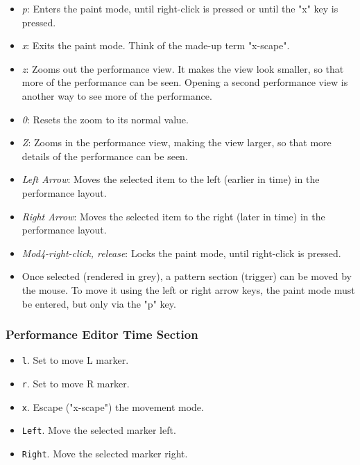    \begin{itemize}
      \item \textsl{p}:  Enters the paint mode, until right-click is pressed or
         until the "x" key is pressed.
      \item \textsl{x}:  Exits the paint mode.  Think of the made-up term
         "x-scape".
      \item \textsl{z}:  Zooms out the performance view.  It makes the view
         look smaller, so that more of the performance can be seen.
         Opening a second performance view is another way to see more
         of the performance.
      \item \textsl{0}:  Resets the zoom to its normal value.
      \item \textsl{Z}:  Zooms in the performance view, making the view
         larger, so that more details of the performance can be seen.
      \item \textsl{Left Arrow}:  Moves the selected item to the left (earlier
         in time) in the performance layout.
      \item \textsl{Right Arrow}:  Moves the selected item to the right (later
         in time) in the performance layout.
      \item \textsl{Mod4-right-click, release}:  Locks the paint mode,
         until right-click is pressed.
      \item Once selected (rendered in grey), a pattern section (trigger)
         can be moved by the mouse.
         To move it using the left or right
         arrow keys, the paint mode must be entered, but only via the "p"
         key.
   \end{itemize}

\subsubsection{Performance Editor Time Section}
\label{subsubsec:kbd_mouse_performance_editor_time_section}

   \begin{itemize}
      \item \texttt{l}.  Set to move L marker.
      \item \texttt{r}.  Set to move R marker.
      \item \texttt{x}.  Escape ("x-scape") the movement mode.
      \item \texttt{Left}.  Move the selected marker left.
      \item \texttt{Right}.  Move the selected marker right.
   \end{itemize}

